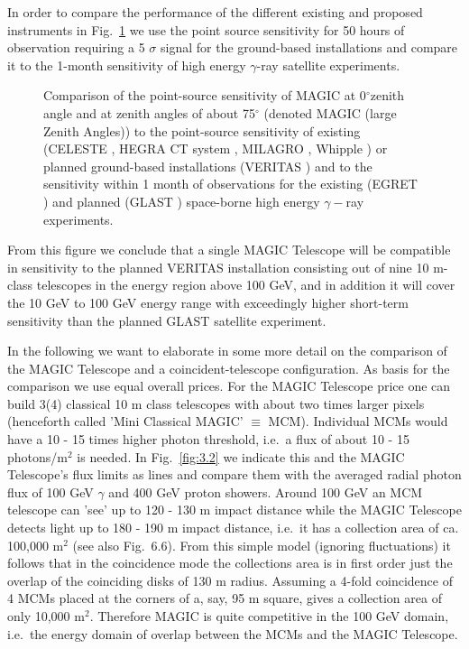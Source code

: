 In order to compare the performance of the different existing and proposed
instruments in Fig.~\ref{fig-sensitivity} we use the point source sensitivity
for 50 hours of observation requiring a 5 $\sigma $ signal for the
ground-based installations and compare it to the 1-month sensitivity of high
energy $\gamma $-ray satellite experiments.

\begin{figure}[htb]
\leavevmode
\centering
\epsfxsize=14cm
\caption{Comparison of the point-source sensitivity of MAGIC at
0$^{\circ }$zenith angle and at zenith angles of about 75$^{\circ }$
(denoted MAGIC (large Zenith Angles)) to the point-source sensitivity of
existing (CELESTE \cite{celeste:95}, HEGRA CT system \cite{aharonian:92}, 
MILAGRO \cite{milagro}, Whipple \cite{weekes:89}) or planned
ground-based installations (VERITAS \cite{veritas:97}) 
and to the sensitivity within 1 month
of observations for the existing (EGRET \cite{egret}) 
and planned (GLAST \cite{bloom:96}) 
space-borne
high energy $\gamma -$ray experiments.}
\label{fig-sensitivity}
\end{figure}

From this figure we conclude that a single MAGIC Telescope will be
compatible in sensitivity to the planned VERITAS installation 
\cite{veritas:97} consisting out
of nine 10 m-class telescopes in the energy region above 100 GeV, and in
addition it will cover the 10 GeV to 100 GeV energy range with exceedingly higher
short-term sensitivity than the planned GLAST satellite \cite{bloom:96}
experiment.

In the following we want to elaborate in some more detail on
the comparison of the MAGIC Telescope and a coincident-telescope
configuration. As basis for the comparison we use equal
overall prices. For the MAGIC Telescope price one can build
3(4) classical 10 m class telescopes with about two times
larger pixels (henceforth called 'Mini Classical MAGIC'
$\equiv$ MCM).  Individual MCMs would have a 10 - 15 times
higher photon threshold, i.e.\ a flux of about 10 - 15
photons/m$^2$ is needed. In Fig.~\ref{fig:3.2} we indicate
this and the MAGIC Telescope's flux limits as lines and
compare them with the averaged radial photon flux of 100 GeV
$\gamma$ and 400 GeV proton showers.  Around 100 GeV an MCM
telescope can 'see' up to 120 - 130 m impact distance while
the MAGIC Telescope detects light up to 180 - 190 m impact
distance, i.e.\ it has a collection area of ca. 100,000
m$^2$ (see also Fig.~6.6).  From this simple model (ignoring
fluctuations) it follows that in the coincidence mode the
collections area is in first order just the overlap of the
coinciding disks of 130 m radius. Assuming a 4-fold
coincidence of 4 MCMs placed at the corners of a, say, 95 m
square, gives a collection area of only 10,000
m$^2$. Therefore MAGIC is quite competitive in the 100 GeV
domain, i.e.\ the energy domain of overlap between the MCMs
and the MAGIC Telescope.

